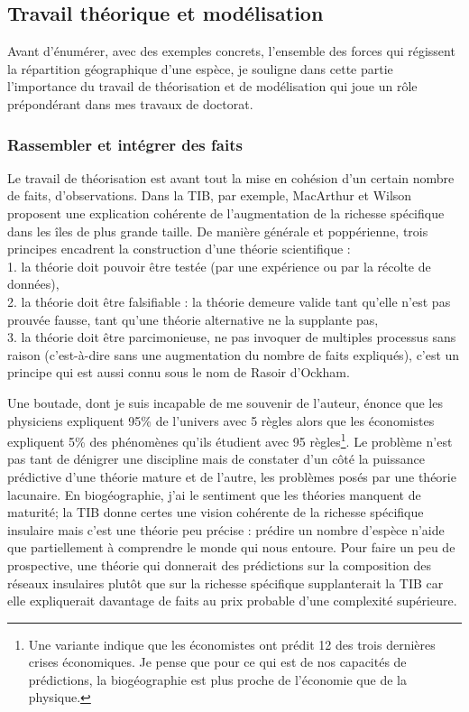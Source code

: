 \subsection*{Travail théorique et
modélisation}\label{travail-thuxe9orique-et-moduxe9lisation}

Avant d'énumérer, avec des exemples concrets, l'ensemble des forces qui
régissent la répartition géographique d'une espèce, je souligne dans
cette partie l'importance du travail de théorisation et de modélisation
qui joue un rôle prépondérant dans mes travaux de doctorat.

\subsubsection*{Rassembler et intégrer des
faits}\label{rassembler-et-intuxe9grer-des-faits}

Le travail de théorisation est avant tout la mise en cohésion d'un
certain nombre de faits, d'observations. Dans la TIB, par exemple,
MacArthur et Wilson proposent une explication cohérente de
l'augmentation de la richesse spécifique dans les îles de plus grande
taille. De manière générale et poppérienne, trois principes encadrent la
construction d'une théorie scientifique :\\
1. la théorie doit pouvoir être testée (par une expérience ou par la
récolte de données),\\
2. la théorie doit être falsifiable : la théorie demeure valide tant
qu'elle n'est pas prouvée fausse, tant qu'une théorie alternative ne la
supplante pas,\\
3. la théorie doit être parcimonieuse, ne pas invoquer de multiples
processus sans raison (c'est-à-dire sans une augmentation du nombre de
faits expliqués), c'est un principe qui est aussi connu sous le nom de
Rasoir d'Ockham.

Une boutade, dont je suis incapable de me souvenir de l'auteur, énonce
que les physiciens expliquent 95\% de l'univers avec 5 règles alors que
les économistes expliquent 5\% des phénomènes qu'ils étudient avec 95
règles\footnote{Une variante indique que les économistes ont prédit 12
  des trois dernières crises économiques. Je pense que pour ce qui est
  de nos capacités de prédictions, la biogéographie est plus proche de
  l'économie que de la physique.}. Le problème n'est pas tant de
dénigrer une discipline mais de constater d'un côté la puissance
prédictive d'une théorie mature et de l'autre, les problèmes posés par
une théorie lacunaire. En biogéographie, j'ai le sentiment que les
théories manquent de maturité; la TIB donne certes une vision cohérente
de la richesse spécifique insulaire mais c'est une théorie peu précise :
prédire un nombre d'espèce n'aide que partiellement à comprendre le
monde qui nous entoure. Pour faire un peu de prospective, une théorie
qui donnerait des prédictions sur la composition des réseaux insulaires
plutôt que sur la richesse spécifique supplanterait la TIB car elle
expliquerait davantage de faits au prix probable d'une complexité
supérieure.

